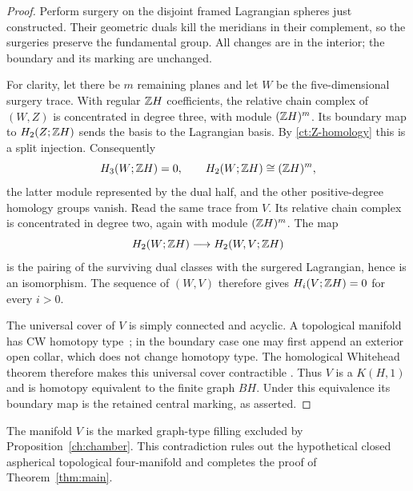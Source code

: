 \begin{proof}
Perform surgery on the disjoint framed Lagrangian spheres just
constructed.  Their geometric duals kill the meridians in their
complement, so the surgeries preserve the fundamental group.
All changes are in the interior; the boundary and its marking are
unchanged.

For clarity, let there be $m$ remaining planes and let $W$ be the
five-dimensional surgery trace.  With regular $\mathbb Z H$ coefficients,
the relative chain complex of $(W,Z)$ is concentrated in degree
three, with module $(\mathbb Z H)^m$.  Its boundary map to
$H_2(Z;\mathbb Z H)$ sends the basis to the Lagrangian basis.  By
\eqref{ct:Z-homology} this is a split injection.  Consequently
\[
 H_3(W;\mathbb Z H)=0,\qquad
 H_2(W;\mathbb Z H)\cong(\mathbb Z H)^m,
\]
the latter module represented by the dual half, and the other
positive-degree homology groups vanish.  Read the same trace from
$V$.  Its relative chain complex is concentrated in degree two,
again with module $(\mathbb Z H)^m$.  The map
\[
            H_2(W;\mathbb Z H)\longrightarrow H_2(W,V;\mathbb Z H)
\]
is the pairing of the surviving dual classes with the surgered
Lagrangian, hence is an isomorphism.  The sequence of $(W,V)$
therefore gives $H_i(V;\mathbb Z H)=0$ for every $i>0$.

The universal cover of $V$ is simply connected and acyclic. A
topological manifold has CW homotopy type~\cite[Corollary~1]{MilnorCW};
in the boundary case one may first append an exterior open collar,
which does not change homotopy type. The homological Whitehead theorem
therefore makes this universal cover contractible
\cite[Corollary~4.33]{Hatcher}. Thus $V$ is a $K(H,1)$ and is homotopy equivalent
to the finite graph $BH$.  Under this equivalence its boundary
map is the retained central marking, as asserted.
\end{proof}

The manifold $V$ is the marked graph-type filling excluded by
Proposition~\ref{ch:chamber}.  This contradiction rules out the hypothetical
closed aspherical topological four-manifold and completes the proof
of Theorem~\ref{thm:main}.
